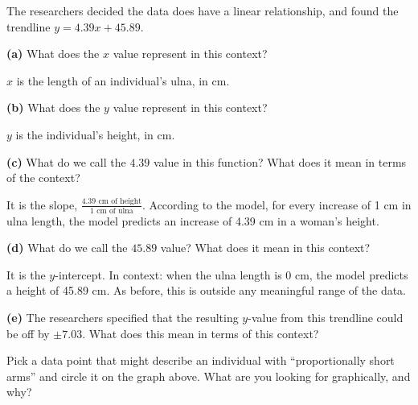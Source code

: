 \documentclass[12pt]{ximera}
\begin{document}
\begin{problem}
The researchers decided the data does have a linear relationship, and found the
trendline $y = 4.39x + 45.89$.

\begin{prompt}
\textbf{(a)} What does the $x$ value represent in this context?
\begin{freeResponse}
\end{freeResponse}

\begin{solution}
$x$ is the length of an individual's ulna, in cm.
\end{solution}
\end{prompt}

\begin{prompt}
\textbf{(b)} What does the $y$ value represent in this context?
\begin{freeResponse}
\end{freeResponse}

\begin{solution}
$y$ is the individual's height, in cm.
\end{solution}
\end{prompt}

\begin{prompt}
\textbf{(c)} What do we call the $4.39$ value in this function? What does it mean in
terms of the context?
\begin{freeResponse}
\end{freeResponse}

\begin{solution}
It is the slope, $\frac{4.39 \text{ cm of height}}{1 \text{ cm of ulna}}$. According
to the model, for every increase of 1 cm in ulna length, the model predicts an
increase of 4.39 cm in a woman's height.
\end{solution}
\end{prompt}

\begin{prompt}
\textbf{(d)} What do we call the $45.89$ value? What does it mean in this context?
\begin{freeResponse}
\end{freeResponse}

\begin{solution}
It is the $y$-intercept. In context: when the ulna length is 0 cm, the model predicts
a height of 45.89 cm. As before, this is outside any meaningful range of the data.
\end{solution}
\end{prompt}

\begin{prompt}
\textbf{(e)} The researchers specified that the resulting $y$-value from this
trendline could be off by $\pm 7.03$. What does this mean in terms of this context?
\begin{freeResponse}
\end{freeResponse}
\end{prompt}
\end{problem}

\begin{problem}
Pick a data point that might describe an individual with ``proportionally short
arms'' and circle it on the graph above. What are you looking for graphically, and why?

\begin{freeResponse}
\end{freeResponse}
\end{problem}
\end{document}
